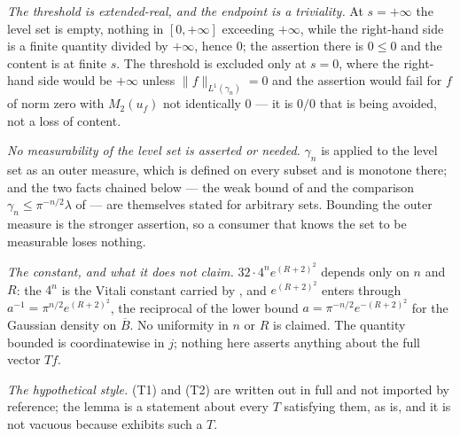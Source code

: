 \begin{lemma}
\emph{The threshold is extended-real, and the endpoint is a triviality.}  At
$s = +\infty$ the level set is empty, nothing in $[0,+\infty]$ exceeding
$+\infty$, while the right-hand side is a finite quantity divided by $+\infty$,
hence $0$; the assertion there is $0 \leq 0$ and the content is at finite $s$.
The threshold is excluded only at $s = 0$, where the right-hand side would be
$+\infty$ unless $\|f\|_{L^1(\gamma_n)} = 0$ and the assertion would fail for
$f$ of norm zero with $M_2(u_f)$ not identically $0$ --- it is $0/0$ that is
being avoided, not a loss of content.

\emph{No measurability of the level set is asserted or needed.}  $\gamma_n$ is
applied to the level set as an outer measure, which is defined on every subset
and is monotone there; and the two facts chained below --- the weak bound of
 and the comparison
$\gamma_n \leq \pi^{-n/2}\lambda$ of  ---
are themselves stated for arbitrary sets.  Bounding the outer measure is the
stronger assertion, so a consumer that knows the set to be measurable loses
nothing.

\emph{The constant, and what it does not claim.}  $32\cdot4^n e^{(R+2)^2}$
depends only on $n$ and $R$: the $4^n$ is the Vitali constant carried by
, and $e^{(R+2)^2}$ enters through
$a^{-1} = \pi^{n/2}e^{(R+2)^2}$, the reciprocal of the lower bound
$a = \pi^{-n/2}e^{-(R+2)^2}$ for the Gaussian density on $\overline B$.  No
uniformity in $n$ or $R$ is claimed.  The quantity bounded is coordinatewise in
$j$; nothing here asserts anything about the full vector $Tf$.

\emph{The hypothetical style.}  (T1) and (T2) are written out in full and not
imported by reference; the lemma is a statement about every $T$ satisfying
them, as  is, and it is not vacuous because
 exhibits such a $T$.
\end{lemma}
